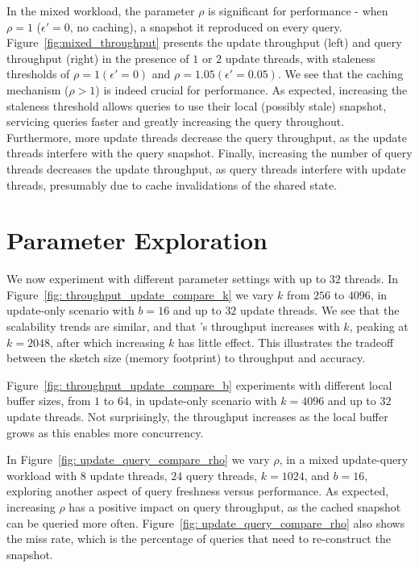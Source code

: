 In the mixed workload, the parameter $\rho$ is significant for performance - when $\rho = 1$ ($\epsilon'=0$, no caching), a snapshot it reproduced on every query.
Figure~\ref{fig:mixed_throughput} presents the update throughput (left) and query throughput (right) in the presence of $1$ or $2$ update threads, with staleness thresholds of $\rho=1 (\epsilon'=0)$ and $\rho=1.05 (\epsilon'=0.05)$. We see that the caching mechanism ($\rho > 1$) is indeed crucial for performance. As expected, increasing the staleness threshold allows queries to use their local (possibly stale) snapshot, servicing queries faster and greatly increasing the query throughout. Furthermore, more update threads decrease the query throughput, as the update threads interfere with the query snapshot. 
Finally, increasing the number of query threads decreases the update throughput, as query threads interfere with update threads, presumably due to cache invalidations of the shared state.


\section{Parameter Exploration}
\label{sec:params} 
We now experiment with different parameter settings with up to $32$ threads. 
In  Figure~\ref{fig: throughput_update_compare_k} we vary $k$ from $256$ to $4096$, in update-only scenario with $b = 16$ and up to $32$ update threads.
We see that the scalability trends are similar, and that \mysketch's throughput increases with $k$, peaking at $k = 2048$, after which increasing $k$ has little effect.
This illustrates the tradeoff between the sketch size (memory footprint) to  throughput and accuracy. 


Figure~\ref{fig: throughput_update_compare_b} experiments with different local buffer sizes, from $1$ to $64$, in update-only scenario with $k = 4096$ and up to $32$ update threads. Not surprisingly, the throughput increases as the local buffer grows as this enables more concurrency. 


In Figure~\ref{fig: update_query_compare_rho} we vary $\rho$, in a mixed update-query workload with $8$ update threads, $24$ query threads, $k = 1024$, and $b = 16$, exploring another aspect of query freshness versus performance. As expected, increasing  $\rho$ has a positive impact on query throughput, as the cached snapshot can be queried more often.  Figure~\ref{fig: update_query_compare_rho} also shows the miss rate, which is the percentage of queries that need to re-construct the snapshot.


